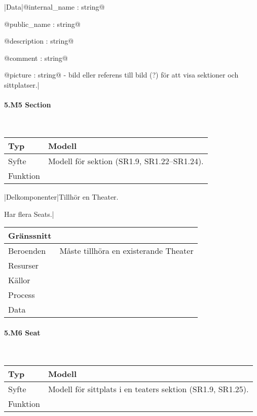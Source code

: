 \documentclass[a4paper, twoside, 11pt, titlepage]{article}
\begin{document}
			|Data|@internal\_name : string@

			@public\_name : string@

			@description : string@

			@comment : string@

			@picture : string@ - bild eller referens till bild (?) för att visa sektioner och sittplatser.|

			\paragraph{5.M5 Section}\

			\begin {table} [ht] \begin{tabular} {  p{3.5cm} p{9.6cm} }
				\hline
				Typ & Modell  \\
				\hline
				Syfte & Modell för sektion (SR1.9, SR1.22--SR1.24).  \\
				\hline
				Funktion &   \\
				\hline
			\end{tabular} \end{table} \FloatBarrier
			\vspace{6mm}

			|Delkomponenter|Tillhör en Theater.

			Har flera Seats.|

			\begin {table} [ht] \begin{tabular} {  p{3.5cm} p{9.6cm} }
				\hline
				Gränssnitt &   \\
				\hline
				Beroenden & Måste tillhöra en existerande Theater  \\
				\hline
				Resurser &   \\
				\hline
				Källor &   \\
				\hline
				Process &   \\
				\hline
				Data &   \\
				\hline
			\end{tabular} \end{table} \FloatBarrier


			\paragraph{5.M6 Seat}\

			\begin {table} [ht] \begin{tabular} {  p{3.5cm} p{9.6cm} }
				\hline
				Typ & Modell  \\
				\hline
				Syfte & Modell för sittplats i en teaters sektion (SR1.9, SR1.25).  \\
				\hline
				Funktion &   \\
				\hline
			\end{tabular} \end{table} \FloatBarrier
			\vspace{6mm}
\end{document}
